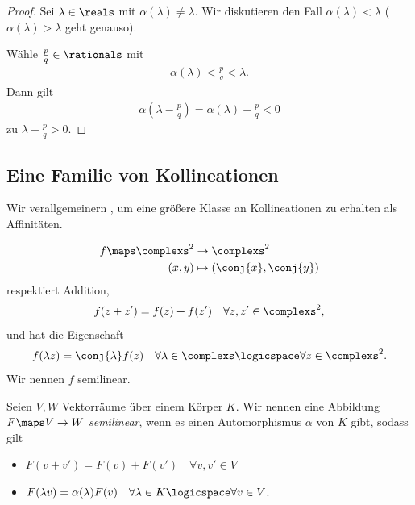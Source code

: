 \begin{proof}
    Sei \( \lambda\in \reals \) mit \( \alpha(\lambda)\neq \lambda \). Wir diskutieren den Fall \( \alpha(\lambda)<\lambda \) (\( \alpha(\lambda)>\lambda \) geht genauso).

    Wähle \( \frac{p}{q}\in \rationals \) mit
    \begin{align*}
        \alpha(\lambda)<\frac{p}{q}<\lambda.
    \end{align*}
    Dann gilt
    \begin{align*}
        \alpha(\lambda-\frac{p}{q})=\alpha(\lambda)-\frac{p}{q}<0
    \end{align*}
    \contra zu \( \lambda-\frac{p}{q}>0 \).
\end{proof}

\subsection*{Eine Familie von Kollineationen}
\begin{idee*}
    Wir verallgemeinern , um eine größere Klasse an Kollineationen zu erhalten als Affinitäten.
\end{idee*}
\begin{beispiel}
    \begin{align*}
        f\maps \begin{aligned}[t]
            \complexs^2&\to \complexs^2\\
            (x,y)&\mapsto (\conj{x},\conj{y})
        \end{aligned}
    \end{align*}
    respektiert Addition, \dh
    \begin{align*}
        f(z+z')=f(z)+f(z')\quad \forall z,z'\in \complexs^2,
    \end{align*}
    und hat die Eigenschaft
    \begin{align*}
        f(\lambda z)=\conj{\lambda} f(z)\quad \forall \lambda\in \complexs\logicspace \forall z\in \complexs^2.
    \end{align*}
    \tto Wir nennen \( f \) semilinear.
\end{beispiel}
\begin{definition*}
    Seien \( V,W \) Vektorräume über einem Körper \( K \). Wir nennen eine Abbildung \( F\maps V\to W \) \emph{semilinear}, wenn es einen Automorphismus \( \alpha \) von \( K \) gibt, sodass gilt
    \begin{itemize}
        \item \(F(v+v')=F(v)+F(v')\quad \forall v,v'\in V\)
        \item \( F(\lambda v)=\alpha(\lambda) F(v)\quad \forall \lambda\in K \logicspace \forall v\in V\).
    \end{itemize}
\end{definition*}
